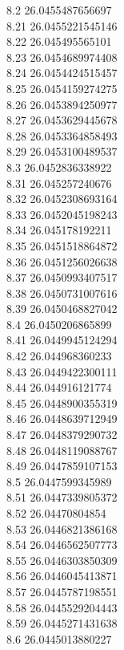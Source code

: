 {8.2	26.0455487656697\\
8.21	26.0455221545146\\
8.22	26.045495565101\\
8.23	26.0454689974408\\
8.24	26.0454424515457\\
8.25	26.0454159274275\\
8.26	26.0453894250977\\
8.27	26.0453629445678\\
8.28	26.0453364858493\\
8.29	26.0453100489537\\
8.3	26.0452836338922\\
8.31	26.045257240676\\
8.32	26.0452308693164\\
8.33	26.0452045198243\\
8.34	26.045178192211\\
8.35	26.0451518864872\\
8.36	26.0451256026638\\
8.37	26.0450993407517\\
8.38	26.0450731007616\\
8.39	26.0450468827042\\
8.4	26.0450206865899\\
8.41	26.0449945124294\\
8.42	26.044968360233\\
8.43	26.0449422300111\\
8.44	26.044916121774\\
8.45	26.0448900355319\\
8.46	26.0448639712949\\
8.47	26.0448379290732\\
8.48	26.0448119088767\\
8.49	26.0447859107153\\
8.5	26.0447599345989\\
8.51	26.0447339805372\\
8.52	26.04470804854\\
8.53	26.0446821386168\\
8.54	26.0446562507773\\
8.55	26.0446303850309\\
8.56	26.0446045413871\\
8.57	26.0445787198551\\
8.58	26.0445529204443\\
8.59	26.0445271431638\\
8.6	26.0445013880227\\
}
